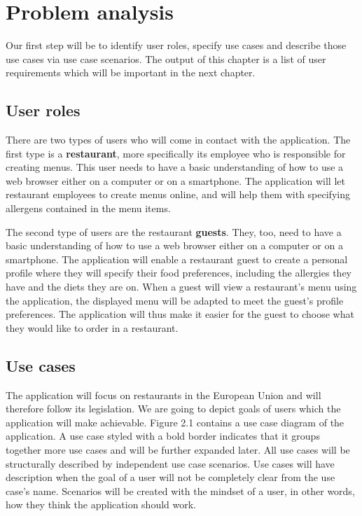 \chapter{Problem analysis}
Our first step will be to identify user roles, specify use cases and describe those use cases via use case scenarios.
The output of this chapter is a list of user requirements which will be important in the next chapter.

\section{User roles}
There are two types of users who will come in contact with the application.
The first type is a \textbf{restaurant}, more specifically its employee who is responsible for creating menus.
This user needs to have a basic understanding of how to use a web browser either on a computer or on a smartphone.
The application will let restaurant employees to create menus online, and will help them with specifying allergens contained in the menu items.

The second type of users are the restaurant \textbf{guests}.
They, too, need to have a basic understanding of how to use a web browser either on a computer or on a smartphone.
The application will enable a restaurant guest to create a personal profile where they will specify their food preferences, including the allergies they have and the diets they are on.
When a guest will view a restaurant's menu using the application, the displayed menu will be adapted to meet the guest's profile preferences.
The application will thus make it easier for the guest to choose what they would like to order in a restaurant.

\section{Use cases}
The application will focus on restaurants in the European Union and will therefore follow its legislation.
We are going to depict goals of users which the application will make achievable.
Figure 2.1 contains a use case diagram of the application.
A use case styled with a bold border indicates that it groups together more use cases and will be further expanded later.
All use cases will be structurally described by independent use case scenarios.
Use cases will have description when the goal of a user will not be completely clear from the use case's name.
Scenarios will be created with the mindset of a user, in other words, how they think the application should work.

